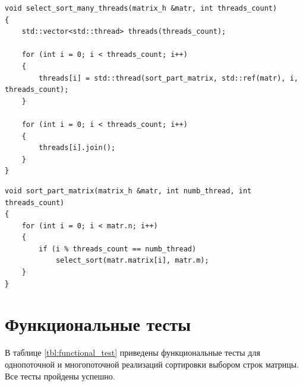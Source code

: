 \documentclass[a4paper,14pt, unknownkeysallowed]{extreport}
\begin{document}
\begin{center}
\captionsetup{justification=raggedright,singlelinecheck=off}
\begin{lstlisting}[label=lst:select_sort_many_threads,caption=Функция многопоточной реализации сортировки выбором строк матрицы]
void select_sort_many_threads(matrix_h &matr, int threads_count)
{   
	std::vector<std::thread> threads(threads_count);

	for (int i = 0; i < threads_count; i++)
	{
		threads[i] = std::thread(sort_part_matrix, std::ref(matr), i, threads_count);
	}

	for (int i = 0; i < threads_count; i++)
	{
		threads[i].join();
	}
}
\end{lstlisting}
\end{center}

\begin{center}
\captionsetup{justification=raggedright,singlelinecheck=off}
\begin{lstlisting}[label=lst:sort_part_matrix,caption=Функция сортировки строк части матрицы для отдельного потока]
void sort_part_matrix(matrix_h &matr, int numb_thread, int threads_count)
{
	for (int i = 0; i < matr.n; i++)
	{   
		if (i % threads_count == numb_thread)
			select_sort(matr.matrix[i], matr.m);
	}
}
\end{lstlisting}
\end{center}

\clearpage

\section{Функциональные тесты}

В таблице \ref{tbl:functional_test} приведены функциональные тесты для однопоточной и многопоточной реализаций сортировки выбором строк матрицы. Все тесты пройдены успешно.
\end{document}
